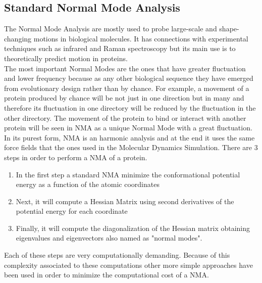 \documentclass[12pt]{article}
\begin{document}
\subsection{Standard Normal Mode Analysis}
The Normal Mode Analysis are mostly used to probe large-scale and shape-changing motions in biological molecules. It has connections with experimental techniques such as infrared and Raman spectroscopy but its main use is to theoretically predict motion in proteins.\\ 

The most important Normal Modes are the ones that have greater fluctuation and lower frequency because as any other biological sequence they have emerged from evolutionary design rather than by chance. For example, a movement of a protein produced by chance will be not just in one direction but in many and therefore its fluctuation in one directory will be reduced by the fluctuation in the other directory. The movement of the protein to bind or interact with another protein will be seen in NMA as a unique Normal Mode with a great fluctuation.\\

In its purest form, NMA is an harmonic analysis and at the end it uses the same force fields that the ones used in the Molecular Dynamics Simulation. There are 3 steps in order to perform a NMA of a protein.
 
\begin{enumerate} [i]
\item In the first step a standard NMA minimize the conformational potential energy as a function of the atomic coordinates
\item Next, it will compute a Hessian Matrix using second derivatives of the potential energy for each coordinate
\item Finally, it will compute the diagonalization of the Hessian matrix obtaining eigenvalues and eigenvectors also named as "normal modes".
\end{enumerate}

Each of these steps are very computationally demanding. Because of this complexity associated to these computations other more simple approaches have been used in order to minimize the computational cost of a NMA.
\end{document}
